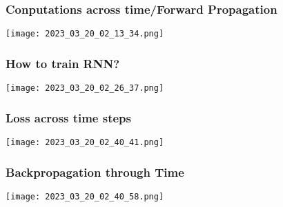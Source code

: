 \documentclass[main.tex,fontsize=8pt,paper=a4,paper=portrait,DIV=calc,]{scrartcl}
\begin{document}
\subsubsection{Conputations across time/Forward Propagation}
\texttt{[image: 2023\_03\_20\_02\_13\_34.png]}
\subsubsection{How to train RNN?}
\texttt{[image: 2023\_03\_20\_02\_26\_37.png]}
\subsubsection{Loss across time steps}
\texttt{[image: 2023\_03\_20\_02\_40\_41.png]}
\subsubsection{Backpropagation through Time}
\texttt{[image: 2023\_03\_20\_02\_40\_58.png]}
\end{document}

